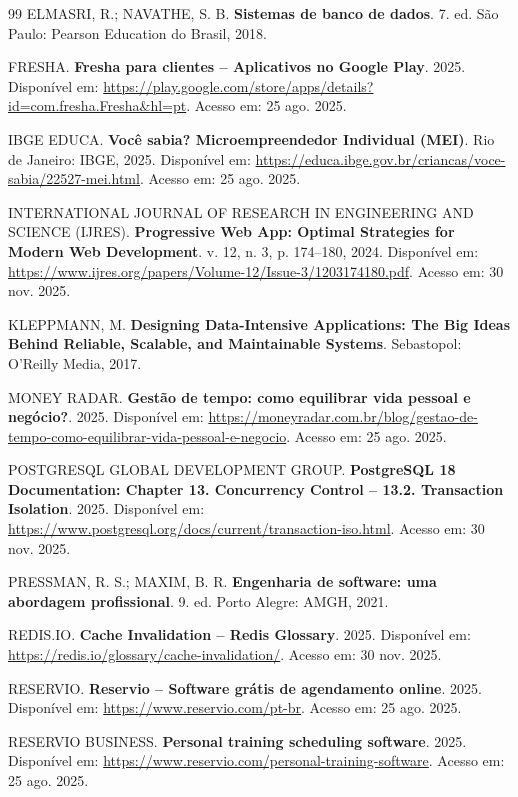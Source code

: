 \documentclass[12pt,a4paper]{article}
\begin{document}
\begin{thebibliography}{99}
ELMASRI, R.; NAVATHE, S. B. \textbf{Sistemas de banco de dados}. 7. ed. São Paulo: Pearson Education do Brasil, 2018.

FRESHA. \textbf{Fresha para clientes -- Aplicativos no Google Play}. 2025. Disponível em: \url{https://play.google.com/store/apps/details?id=com.fresha.Fresha&hl=pt}. Acesso em: 25 ago. 2025.

IBGE EDUCA. \textbf{Você sabia? Microempreendedor Individual (MEI)}. Rio de Janeiro: IBGE, 2025. Disponível em: \url{https://educa.ibge.gov.br/criancas/voce-sabia/22527-mei.html}. Acesso em: 25 ago. 2025.

INTERNATIONAL JOURNAL OF RESEARCH IN ENGINEERING AND SCIENCE (IJRES). \textbf{Progressive Web App: Optimal Strategies for Modern Web Development}. v. 12, n. 3, p. 174--180, 2024. Disponível em: \url{https://www.ijres.org/papers/Volume-12/Issue-3/1203174180.pdf}. Acesso em: 30 nov. 2025.

KLEPPMANN, M. \textbf{Designing Data-Intensive Applications: The Big Ideas Behind Reliable, Scalable, and Maintainable Systems}. Sebastopol: O'Reilly Media, 2017.

MONEY RADAR. \textbf{Gestão de tempo: como equilibrar vida pessoal e negócio?}. 2025. Disponível em: \url{https://moneyradar.com.br/blog/gestao-de-tempo-como-equilibrar-vida-pessoal-e-negocio}. Acesso em: 25 ago. 2025.

POSTGRESQL GLOBAL DEVELOPMENT GROUP. \textbf{PostgreSQL 18 Documentation: Chapter 13. Concurrency Control -- 13.2. Transaction Isolation}. 2025. Disponível em: \url{https://www.postgresql.org/docs/current/transaction-iso.html}. Acesso em: 30 nov. 2025.

PRESSMAN, R. S.; MAXIM, B. R. \textbf{Engenharia de software: uma abordagem profissional}. 9. ed. Porto Alegre: AMGH, 2021.

REDIS.IO. \textbf{Cache Invalidation -- Redis Glossary}. 2025. Disponível em: \url{https://redis.io/glossary/cache-invalidation/}. Acesso em: 30 nov. 2025.

RESERVIO. \textbf{Reservio -- Software grátis de agendamento online}. 2025. Disponível em: \url{https://www.reservio.com/pt-br}. Acesso em: 25 ago. 2025.

RESERVIO BUSINESS. \textbf{Personal training scheduling software}. 2025. Disponível em: \url{https://www.reservio.com/personal-training-software}. Acesso em: 25 ago. 2025.


\end{thebibliography}
\end{document}
